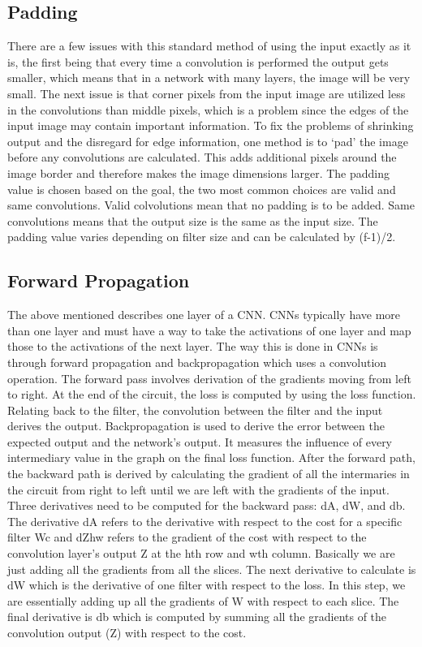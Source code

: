 \documentclass[10pt,twocolumn]{article}
\begin{document}
\subsection{Padding}
There are a few issues with this standard method of using the input exactly as it is, the first being that every time a convolution is performed the output gets smaller, which means that in a network with many layers, the image will be very small. The next issue is that corner pixels from the input image are utilized less in the convolutions than middle pixels, which is a problem since the edges of the input image may contain important information. To fix the problems of shrinking output and the disregard for edge information, one method is to ‘pad’ the image before any convolutions are calculated. This adds additional pixels around the image border and therefore makes the image dimensions larger. The padding value is chosen based on the goal, the two most common choices are valid and same convolutions. Valid colvolutions mean that no padding is to be added. Same convolutions means that the output size is the same as the input size. The padding value varies depending on filter size and can be calculated by (f-1)/2. 

\subsection{Forward Propagation}
The above mentioned describes one layer of a CNN. CNNs typically have more than one layer and must have a way to take the activations of one layer and map those to the activations of the next layer. The way this is done in CNNs is through forward propagation and backpropagation which uses a convolution operation. The forward pass involves derivation of the gradients moving from left to right. At the end of the circuit, the loss is computed by using the loss function. Relating back to the filter, the convolution between the filter and the input derives the output. Backpropagation is used to derive the error between the expected output and the network’s output. It measures the influence of every intermediary value in the graph on the final loss function. After the forward path, the backward path is derived by calculating the gradient of all the intermaries in the circuit from right to left until we are left with the gradients of the input. Three derivatives need to be computed for the backward pass: dA, dW, and db. The derivative dA refers to the derivative with respect to the cost for a specific filter Wc and  dZhw refers to the gradient of the cost with respect to the convolution layer’s output Z at the hth row and wth column. Basically we are just adding all the gradients from all the slices. The next derivative to calculate is dW which is the derivative of one filter with respect to the loss. In this step, we are essentially adding up all the gradients of W with respect to each slice. The final derivative is db which is computed by summing all the gradients of the convolution output (Z) with respect to the cost.
\end{document}
